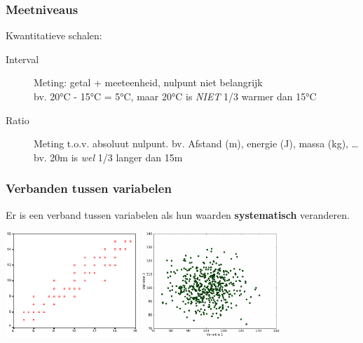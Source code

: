 \documentclass{beamer}
\begin{document}
\begin{frame}
  \frametitle{Meetniveaus}

  Kwantitatieve schalen:

  \begin{description}
    \item[Interval] Meting: getal + meeteenheid, nulpunt niet belangrijk\\
      bv. 20°C - 15°C = 5°C, maar 20°C is \emph{NIET} 1/3 warmer dan 15°C
    \item[Ratio] Meting t.o.v. absoluut nulpunt. bv. Afstand (m), energie (J), massa (kg), \ldots\\
      bv. 20m is \emph{wel} 1/3 langer dan 15m
  \end{description}
\end{frame}

\begin{frame}
  \frametitle{Verbanden tussen variabelen}

  Er is een verband tussen variabelen als hun waarden \textbf{systematisch} veranderen.

  \begin{center}
    \includegraphics[height=4cm]{img/les1-08a}
    \includegraphics[height=4cm]{img/les1-08b}
  \end{center}
\end{frame}
\end{document}
